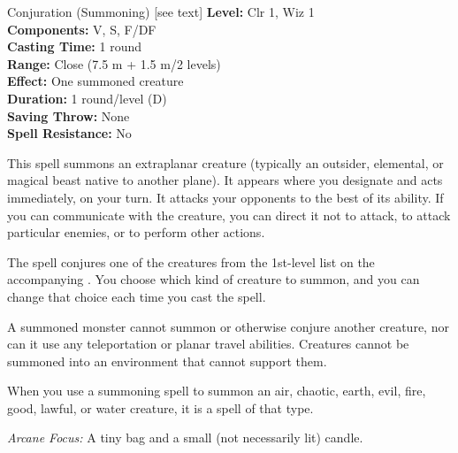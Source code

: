 {Conjuration (Summoning) [see text]}
{
	\textbf{Level:}
	Clr 1, Wiz 1\\
	\textbf{Components:}
	V, S, F/DF\\
	\textbf{Casting Time:}
	1 round\\
	\textbf{Range:}
	Close (7.5 m + 1.5 m/2 levels)\\
	\textbf{Effect:}
	One summoned creature\\
	\textbf{Duration:}
	1 round/level (D)\\
	\textbf{Saving Throw:}
	None\\
	\textbf{Spell Resistance:}
	No\\
}
{

	This spell summons an extraplanar creature (typically an outsider, elemental, or magical beast native to another plane). It appears where you designate and acts immediately, on your turn. It attacks your opponents to the best of its ability. If you can communicate with the creature, you can direct it not to attack, to attack particular enemies, or to perform other actions.

	The spell conjures one of the creatures from the 1st-level list on the accompanying . You choose which kind of creature to summon, and you can change that choice each time you cast the spell.

	A summoned monster cannot summon or otherwise conjure another creature, nor can it use any teleportation or planar travel abilities. Creatures cannot be summoned into an environment that cannot support them.

	When you use a summoning spell to summon an air, chaotic, earth, evil, fire, good, lawful, or water creature, it is a spell of that type.

	\textit{Arcane Focus:}
	A tiny bag and a small (not necessarily lit) candle.

}
